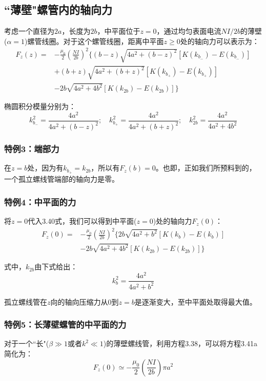 \subsection{``薄壁"螺管内的轴向力}
考虑一个直径为$2a$，长度为$2b$，中平面位于$z=0$，通过均匀表面电流$NI/2b$的薄壁($\alpha=1$)螺管线圈。对于这个螺管线圈，距离中平面$z\ge 0$处的轴向力可以表示为：
\begin{equation}
\begin{split}
F_z(z)=&-\frac{\mu_0}{2}(\frac{NI}{2b})^2\{(b-z)\sqrt{4a^2+(b-z)^2}[K(k_{b_-})-E(k_{b_-})]\\
&+(b+z)\sqrt{4a^2+(b+z)^2}[K(k_{b_+})-E(k_{b_+})]\\
&-2b\sqrt{4a^2+4b^2}[K(k_{2b})-E(k_{2b})]\}
\end{split}
\end{equation}

椭圆积分模量分别为：
$$k_{b_-}^2=\frac{4a^2}{4a^2+(b-z)^2} ; \quad k_{b_+}^2=\frac{4a^2}{4a^2+(b+z)^2} ;\quad k_{2b}^2=\frac{4a^2}{4a^2+4 b^2}$$

\subsubsection{特例3：端部力}
在$z=b$处，因为有$k_{b_+}=k_{2b}$，所以有$F_z(b)=0$。也即，正如我们所预料到的，一个孤立螺线管端部的轴向力是零。

\subsubsection{特例4：中平面的力}
将$z=0$代入3.40式，我们可以得到中平面($z=0$)处的轴向力$F_z(0)$：
\begin{equation}
\begin{split}
  F_z(0)=&-\frac{\mu_0}{2}(\frac{NI}{2b})^2\{2b\sqrt{4a^2+b^2}[K(k_{b})-E(k_{b})]\\
  &-2b\sqrt{4a^2+4b^2}[K(k_{2b})-E(k_{2b})]\}
\end{split}
\end{equation}

式中，$k_{2b}$由下式给出：
$$k_{b}^2=\frac{4a^2}{4a^2+b^2}$$

孤立螺线管在$z$向的轴向压缩力从$0$到$z=b$是逐渐变大，至中平面处取得最大值。

\subsubsection{特例5：长薄壁螺管的中平面的力}
对于一个``长"($\beta\gg 1$或者$k^2\ll 1$)的薄壁螺线管，利用方程3.38，可以将方程3.41a简化为：
\begin{equation*}
F_z(0)\simeq-\frac{\mu_0}{2}(\frac{NI}{2b})\pi a^2 \tag{3.41'}
\end{equation*}

